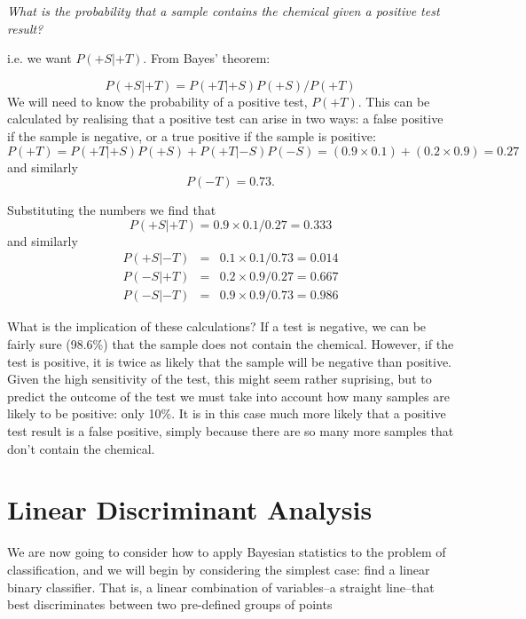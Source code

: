 \documentclass[12pt,a4paper]{tufte-handout}
\begin{document}
\textit{What is the probability that a sample contains the chemical given a positive test result?}

i.e. we want $P(+S|+T)$. From Bayes' theorem:

\begin{equation*}
  P(+S|+T) = P(+T|+S)P(+S)/P(+T)
\end{equation*}
We will need to know the probability of a positive test, $P(+T)$. This can be calculated by realising that a positive test can arise in two ways: a false positive if the sample is negative, or a true positive if the sample is positive:
\begin{equation*}
  P(+T) = P(+T|+S)P(+S)+P(+T|-S)P(-S) = (0.9\times0.1)+(0.2\times 0.9) = 0.27
\end{equation*}
and similarly
\begin{equation*}
  P(-T) = 0.73.
\end{equation*}

Substituting the numbers we find that
\begin{equation*}
  P(+S|+T) = 0.9\times0.1/0.27 = 0.333
\end{equation*}
and similarly
\begin{eqnarray*}
  P(+S|-T) &=& 0.1\times0.1/0.73 = 0.014\\
  P(-S|+T) &=& 0.2\times0.9/0.27 = 0.667\\
  P(-S|-T) &=& 0.9\times0.9/0.73 = 0.986
\end{eqnarray*}

What is the implication of these calculations? If a test is negative, we can be fairly sure (98.6\%) that the sample does not contain the chemical. However, if the test is positive, it is twice as likely that the sample will be negative than positive. Given the high sensitivity of the test, this might seem rather suprising, but to predict the outcome of the test we must take into account how many samples are likely to be positive: only 10\%. It is in this case much more likely that a positive test result is a false positive, simply because there are so many more samples that don't contain the chemical.

\section{Linear Discriminant Analysis}

We are now going to consider how to apply Bayesian statistics to the problem of classification, and we will begin by considering the simplest case: find a linear binary classifier. That is, a linear combination of variables--a straight line--that best discriminates between two pre-defined groups of points
\end{document}
